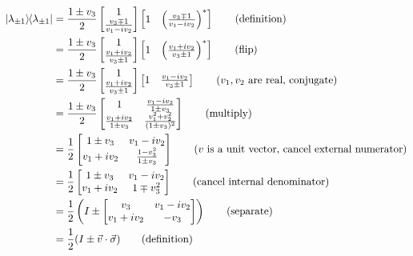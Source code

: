 \begin{align*}
	\kb{\lambda_{\pm1}} &= \frac{1\pm v_3}{2 } \begin{bmatrix}
		1 \\
		\frac{v_3\mp1}{v_1 - iv_2}
	\end{bmatrix}
	\begin{bmatrix}
   		1 &
   		\left(\frac{v_3\mp1}{v_1 - iv_2}\right)^*
	\end{bmatrix} \tag{definition}\\
	&=  \frac{1\pm v_3}{2 } \begin{bmatrix}
		1 \\
		\frac{v_1 + iv_2}{v_3\pm1}
	\end{bmatrix}
	\begin{bmatrix}
   		1 &
   		\left(\frac{v_1 + iv_2}{v_3\pm1}\right)^*
	\end{bmatrix} \tag{flip}\\
	&=\frac{1\pm v_3}{2 } \begin{bmatrix}
		1 \\
		\frac{v_1 + iv_2}{v_3\pm1}
	\end{bmatrix}
	\begin{bmatrix}
   		1 &
   		\frac{v_1 - iv_2}{v_3\pm1}
	\end{bmatrix} \tag{$v_1,v_2$ are real, conjugate}\\
%
	&=
	 \frac{1\pm v_3}{2 } \begin{bmatrix}
    	 1 & \frac{v_1 - iv_2}{1 \pm v_3} \\
    	 \frac{v_1 + iv_2}{1 \pm v_3} & \frac{v_1^2+v_2^2}{(1 \pm v_3)^2}
	 \end{bmatrix} \tag{multiply}\\
	 &= \frac{1}{2}\begin{bmatrix} 1\pm v_3 & v_1-iv_2 \\ v_1+iv_2 & \frac{1-v_3^2}{1\pm v_3}\end{bmatrix} \tag{$v$ is a unit vector, cancel external numerator}\\
	 &= \frac{1}{2}\begin{bmatrix} 1\pm v_3 & v_1-iv_2 \\ v_1+iv_2 & 1\mp v_3^2 \end{bmatrix} \tag{cancel internal denominator}\\
	 &= \frac{1}{2}\left(I\pm \begin{bmatrix}v_3 & v_1-iv_2 \\ v_1+iv_2 & -v_3\end{bmatrix}\right) \tag{separate}\\
	 &= \frac{1}{2}(I\pm\vec{v}\cdot\vec{\sigma}) \tag{definition}
\end{align*}
